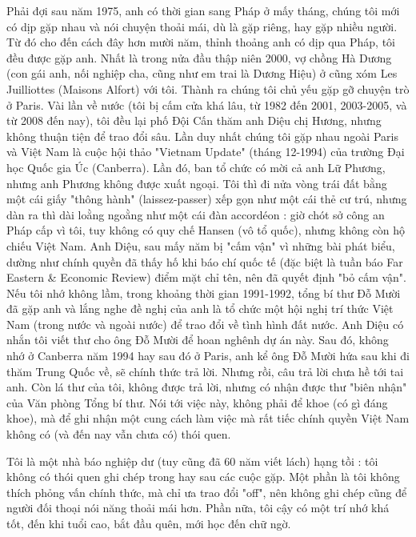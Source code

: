 Phải đợi sau năm 1975, anh có thời gian sang Pháp ở mấy tháng, chúng tôi mới có dịp gặp nhau và nói chuyện thoải mái, dù là gặp riêng, hay gặp nhiều người. Từ đó cho đến cách đây hơn mười năm, thỉnh thoảng anh có dịp qua Pháp, tôi đều được gặp anh. Nhất là trong nửa đầu thập niên 2000, vợ chồng Hà Dương (con gái anh, nối nghiệp cha, cũng như em trai là Dương Hiệu) ở cũng xóm Les Juilliottes (Maisons Alfort) với tôi. Thành ra chúng tôi chủ yếu gặp gỡ chuyện trò ở Paris. Vài lần về nước (tôi bị cấm cửa khá lâu, từ 1982 đến 2001, 2003-2005, và từ 2008 đến nay), tôi đều lại phố Đội Cấn thăm anh Diệu chị Hương, nhưng không thuận tiện để trao đổi sâu. Lần duy nhất chúng tôi gặp nhau ngoài Paris và Việt Nam là cuộc hội thảo "Vietnam Update" (tháng 12-1994) của trường Đại học Quốc gia Úc (Canberra). Lần đó, ban tổ chức có mời cả anh Lữ Phương, nhưng anh Phương không được xuất ngoại. Tôi thì đi nửa vòng trái đất bằng một cái giấy "thông hành" (laissez-passer) xếp gọn như một cái thẻ cư trú, nhưng dàn ra thì dài loằng ngoằng như một cái đàn accordéon : giờ chót sở công an Pháp cấp vì tôi, tuy không có quy chế Hansen (vô tổ quốc), nhưng không còn hộ chiếu Việt Nam. Anh Diệu, sau mấy năm bị "cấm vận" vì những bài phát biểu, dường như chính quyền đã thấy hố khi báo chí quốc tế (đặc biệt là tuần báo Far Eastern \& Economic Review) điểm mặt chỉ tên, nên đã quyết định "bỏ cấm vận". Nếu tôi nhớ không lầm, trong khoảng thời gian 1991-1992, tổng bí thư Đỗ Mười đã gặp anh và lắng nghe đề nghị của anh là tổ chức một hội nghị trí thức Việt Nam (trong nước và ngoài nước) để trao đổi về tình hình đất nước. Anh Diệu có nhắn tôi viết thư cho ông Đỗ Mười để hoan nghênh dự án này. Sau đó, không nhớ ở Canberra năm 1994 hay sau đó ở Paris, anh kể ông Đỗ Mười hứa sau khi đi thăm Trung Quốc về, sẽ chính thức trả lời. Nhưng rồi, câu trả lời chưa hề tới tai anh. Còn lá thư của tôi, không được trả lời, nhưng có nhận được thư "biên nhận" của Văn phòng Tổng bí thư. Nói tới việc này, không phải để khoe (có gì đáng khoe), mà để ghi nhận một cung cách làm việc mà rất tiếc chính quyền Việt Nam không có (và đến nay vẫn chưa có) thói quen.

Tôi là một nhà báo nghiệp dư (tuy cũng đã 60 năm viết lách) hạng tồi : tôi không có thói quen ghi chép trong hay sau các cuộc gặp. Một phần là tôi không thích phỏng vấn chính thức, mà chỉ ưa trao đổi "off", nên không ghi chép cũng để người đối thoại nói năng thoải mái hơn. Phần nữa, tôi cậy có một trí nhớ khá tốt, đến khi tuổi cao, bắt đầu quên, mới học đến chữ ngờ.

